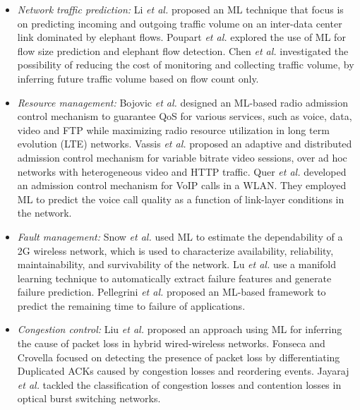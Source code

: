 \begin{itemize}
    \item \textit{Network traffic prediction:}  Li \textit{et al.} \cite{li2016predicting} proposed an ML technique that focus is on predicting incoming and outgoing traffic volume on an inter-data center link dominated by elephant flows. Poupart \textit{et al.} \cite{Poupart_2016:online} explored the use of ML for flow size prediction and elephant flow detection. Chen \textit{et al.} \cite{chen2016predicting} investigated the possibility of reducing the cost of monitoring and collecting traffic volume, by inferring future traffic volume based on flow count only.  %
    
    \item \textit{Resource management:} Bojovic \textit{et al.} \cite{bojovic2012cognitive} designed an ML-based radio admission control mechanism to guarantee QoS for various services, such as voice, data, video and FTP while maximizing radio resource utilization in long term evolution (LTE) networks. Vassis \textit{et al.} \cite{vassis2014admission} proposed an adaptive and distributed admission control mechanism for variable bitrate video sessions, over ad hoc networks with heterogeneous video and HTTP traffic. Quer \textit{et al.} \cite{quer2011cognitive} developed an admission control mechanism for VoIP calls in a WLAN. They employed ML to predict the voice call quality as a function of link-layer conditions in the network.
    
    \item \textit{Fault management:} Snow \textit{et al.} \cite{snow2005assessing} used ML to estimate the dependability of a 2G wireless network, which is used to characterize availability, reliability, maintainability, and survivability of the network. Lu \textit{et al.} \cite{lu2009using} use a manifold learning technique to automatically extract failure features and generate failure prediction. Pellegrini \textit{et al.} \cite{pellegrini2015machine} proposed an ML-based framework to predict the remaining time to failure of applications.
    
    \item \textit{Congestion control:} Liu \textit{et al.} \cite{liu2003end} proposed an approach using ML for inferring the cause of packet loss in hybrid wired-wireless networks. Fonseca and Crovella \cite{fonseca2005bayesian} focused on detecting the presence of packet loss by differentiating Duplicated ACKs caused by congestion losses and reordering events. Jayaraj \textit{et al.} \cite{jayaraj2008loss} tackled the classification of congestion losses and contention losses in optical burst switching networks.%
\end{itemize}{}

